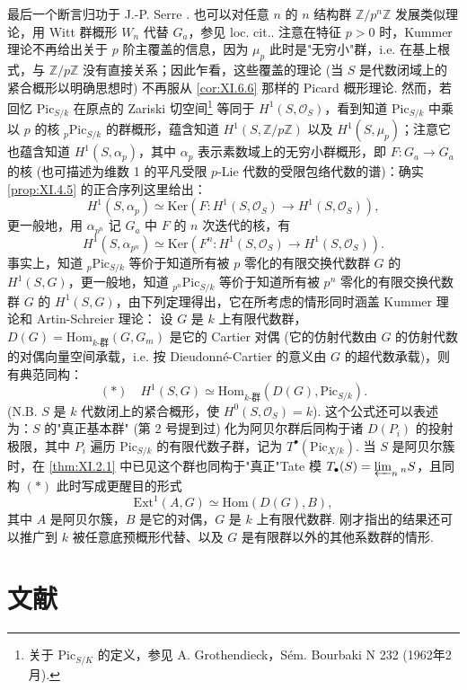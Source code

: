 \begin{remark}\label{rem:XI.6.11}
最后一个断言归功于 J.-P. Serre \cite{exp11-9}. 也可以对任意 $n$ 的 $n$ 结构群 $\mathbb{Z}/p^n\mathbb{Z}$ 发展类似理论，用 Witt 群概形 $W_n$ 代替 $G_a$，参见 loc. cit.. 注意在特征 $p > 0$ 时，Kummer 理论不再给出关于 $p$ 阶主覆盖的信息，因为 $\mu_p$ 此时是"无穷小"群，i.e. 在基上根式，与 $\mathbb{Z}/p\mathbb{Z}$ 没有直接关系；因此乍看，这些覆盖的理论 (当 $S$ 是代数闭域上的紧合概形以明确思想时) 不再服从 \ref{cor:XI.6.6} 那样的 Picard 概形理论. 然而，若回忆 $\mathrm{Pic}_{S/k}$ 在原点的 Zariski 切空间\footnote{关于 $\mathrm{Pic}_{S/K}$ 的定义，参见 A. Grothendieck，S\'em. Bourbaki N 232 (1962年2月).} 等同于 $H^1(S, \mathcal{O}_S)$，看到知道 $\mathrm{Pic}_{S/k}$ 中乘以 $p$ 的核 ${}_p \mathrm{Pic}_{S/k}$ 的群概形，蕴含知道 $H^1(S, \mathbb{Z}/p\mathbb{Z})$ 以及 $H^1(S, \mu_p)$；注意它也蕴含知道 $H^1(S, \alpha_p)$，其中 $\alpha_p$ 表示素数域上的无穷小群概形，即 $F \colon G_a \to G_a$ 的核 (也可描述为维数 1 的平凡受限 $p$-Lie 代数的受限包络代数的谱)：确实 \ref{prop:XI.4.5} 的正合序列这里给出：
\[
H^1(S, \alpha_p) \simeq \mathrm{Ker}(F \colon H^1(S, \mathcal{O}_S) \longrightarrow H^1(S, \mathcal{O}_S)),
\]
更一般地，用 $\alpha_{p^n}$ 记 $G_a$ 中 $F$ 的 $n$ 次迭代的核，有
\[
H^1(S, \alpha_{p^n}) \simeq \mathrm{Ker}(F^n \colon H^1(S, \mathcal{O}_S) \longrightarrow H^1(S, \mathcal{O}_S)).
\]
事实上，知道 ${}_p \mathrm{Pic}_{S/k}$ 等价于知道所有被 $p$ 零化的有限交换代数群 $G$ 的 $H^1(S, G)$，更一般地，知道 ${}_{p^n} \mathrm{Pic}_{S/k}$ 等价于知道所有被 $p^n$ 零化的有限交换代数群 $G$ 的 $H^1(S, G)$，由下列定理得出，它在所考虑的情形同时涵盖 Kummer 理论和 Artin-Schreier 理论：
设 $G$ 是 $k$ 上有限代数群，$D(G) = \mathrm{Hom}_{k\text{-群}}(G, G_m)$ 是它的 Cartier 对偶 (它的仿射代数由 $G$ 的仿射代数的对偶向量空间承载，i.e. 按 Dieudonn\'e-Cartier 的意义由 $G$ 的超代数承载)，则有典范同构：
\[
(\ast) \quad H^1(S, G) \simeq \mathrm{Hom}_{k\text{-群}}(D(G), \mathrm{Pic}_{S/k}).
\]
(N.B. $S$ 是 $k$ 代数闭上的紧合概形，使 $H^0(S, \mathcal{O}_S) = k$). 这个公式还可以表述为：$S$ 的"真正基本群" (第 2 号提到过) 化为阿贝尔群后同构于诸 $D(P_i)$ 的投射极限，其中 $P_i$ 遍历 $\mathrm{Pic}_{S/k}$ 的有限代数子群，记为 $T^{\bullet}(\mathrm{Pic}_{X/k})$. 当 $S$ 是阿贝尔簇时，在 \ref{thm:XI.2.1} 中已见这个群也同构于"真正"Tate 模 $T_\bullet(S) = \varprojlim_n {}_n S$，且同构 $(\ast)$ 此时写成更醒目的形式
\[
\mathrm{Ext}^1(A, G) \simeq \mathrm{Hom}(D(G), B),
\]
其中 $A$ 是阿贝尔簇，$B$ 是它的对偶，$G$ 是 $k$ 上有限代数群. 刚才指出的结果还可以推广到 $k$ 被任意底预概形代替、以及 $G$ 是有限群以外的其他系数群的情形.
\end{remark}

\section{文献}\printbibliography[heading=none]


